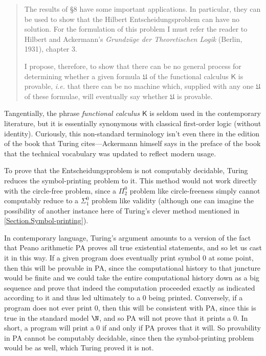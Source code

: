 \documentclass{amsart}
\begin{document}
\begin{quote}\small

\hspace{1em} The results of §8 have some important applications. In particular, they can be used to show that the Hilbert Entscheidungsproblem can have no solution. For the formulation of this problem I must refer the reader to Hilbert and Ackermann's \textit{Grundzüge der Theoretischen Logik} (Berlin, 1931), chapter 3. 

I propose, therefore, to show that there can be no general process for determining whether a given formula $\mathfrak{U}$ of the functional calculus $\mathsf{K}$ is provable, \textit{i.e.} that there can be no machine which, supplied with any one $\mathfrak{U}$ of these formulae, will eventually say whether $\mathfrak{U}$ is provable. \cite[§11, p. 259]{Turing1936:On-computable-numbers}
\end{quote}

Tangentially, the phrase \textit{functional calculus $\mathsf{K}$} is seldom used in the contemporary literature, but it is essentially synonymous with classical first-order logic (without identity). Curiously, this non-standard terminology isn't even there in the edition of the book that Turing cites---Ackermann himself says in the preface of the book that the technical vocabulary was updated to reflect modern usage.

To prove that the Entscheidungsproblem is not computably decidable, Turing reduces the symbol-printing problem to it. This method would not work directly with the circle-free problem, since a $\Pi^0_2$ problem like circle-freeness simply cannot computably reduce to a $\Sigma^0_1$ problem like validity (although one can imagine the possibility of another instance here of Turing's clever method mentioned in \ref{Section.Symbol-printing}).

In contemporary language, Turing's argument amounts to a version of the fact that Peano arithmetic PA proves all true existential statements, and so let us cast it in this way. If a given program does eventually print symbol $0$ at some point, then this will be provable in PA, since the computational history to that juncture would be finite and we could take the entire computational history down as a big sequence and prove that indeed the computation proceeded exactly as indicated according to it and thus led ultimately to a $0$ being printed. Conversely, if a program does not ever print $0$, then this will be consistent with PA, since this is true in the standard model $\N$, and so PA will not prove that it prints a $0$. In short, a program will print a $0$ if and only if PA proves that it will. So provability in PA cannot be computably decidable, since then the symbol-printing problem would be as well, which Turing proved it is not.
\end{document}
